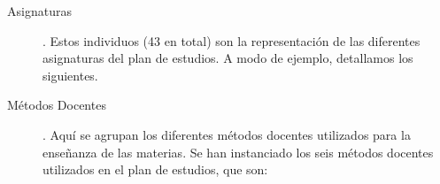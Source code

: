 \begin{description}
	
 		 

		\item [Asignaturas]. Estos individuos (43 en total) son la representación de las diferentes asignaturas del plan de estudios. A modo de ejemplo, detallamos los siguientes.
		 
		 
		 
  
  
		\item [Métodos Docentes]. Aquí se agrupan los diferentes métodos docentes utilizados para la enseñanza de las materias. Se han instanciado los seis métodos docentes utilizados en el plan de estudios, que son: 
  

\end{description}
